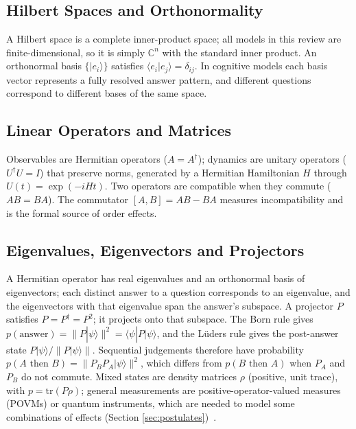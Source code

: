 \documentclass[pdflatex,sn-basic]{sn-jnl}
\newcommand{\ket}[1]{|#1\rangle}
\newcommand{\bra}[1]{\langle #1|}
\begin{document}
\subsection{Hilbert Spaces and Orthonormality}\label{sec:hilbert}
A Hilbert space is a complete inner-product space; all models in this review are finite-dimensional, so it is simply $\mathbb{C}^n$ with the standard inner product. An orthonormal basis $\{\ket{e_i}\}$ satisfies $\langle e_i|e_j\rangle = \delta_{ij}$. In cognitive models each basis vector represents a fully resolved answer pattern, and different questions correspond to different bases of the same space.

\subsection{Linear Operators and Matrices}\label{sec:ops}
Observables are Hermitian operators ($A = A^{\dagger}$); dynamics are unitary operators ($U^{\dagger}U = I$) that preserve norms, generated by a Hermitian Hamiltonian $H$ through $U(t) = \exp(-iHt)$. Two operators are compatible when they commute ($AB = BA$). The commutator $[A, B] = AB - BA$ measures incompatibility and is the formal source of order effects.

\subsection{Eigenvalues, Eigenvectors and Projectors}\label{sec:proj}
A Hermitian operator has real eigenvalues and an orthonormal basis of eigenvectors; each distinct answer to a question corresponds to an eigenvalue, and the eigenvectors with that eigenvalue span the answer's subspace. A projector $P$ satisfies $P = P^{\dagger} = P^2$; it projects onto that subspace. The Born rule gives $p(\text{answer}) = \lVert P\ket{\psi}\rVert^2 = \bra{\psi}P\ket{\psi}$, and the L\"uders rule gives the post-answer state $P\ket{\psi}/\lVert P\ket{\psi}\rVert$. Sequential judgements therefore have probability $p(A \text{ then } B) = \lVert P_B P_A \ket{\psi}\rVert^2$, which differs from $p(B \text{ then } A)$ when $P_A$ and $P_B$ do not commute. Mixed states are density matrices $\rho$ (positive, unit trace), with $p = \mathrm{tr}(P\rho)$; general measurements are positive-operator-valued measures (POVMs) or quantum instruments, which are needed to model some combinations of effects (Section \ref{sec:postulates})~\citep{Ozawa2020,Fuyama2025}.
\end{document}
